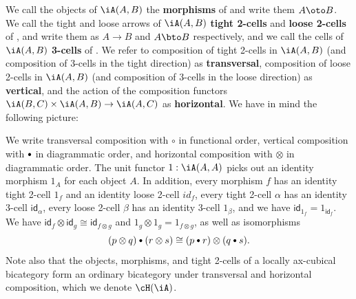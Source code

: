 \documentclass{amsart}
\newcommand{\bcomp}{\mathbin{\raisebox{1pt}{\scriptsize$\bullet$}}}
\let\ocomp\otimes
\renewcommand{\id}{\mathsf{id}}
\begin{document}
We call the objects of $\iA(A,B)$ the \textbf{morphisms} of \iA and write them $A\oto B$.
We call the tight and loose arrows of $\iA(A,B)$ \textbf{tight 2-cells} and \textbf{loose 2-cells} of \iA, and write them as $A\to B$ and $A\bto B$ respectively, and we call the cells of $\iA(A,B)$ \textbf{3-cells} of \iA.
We refer to composition of tight 2-cells in $\iA(A,B)$ (and composition of 3-cells in the tight direction) as \textbf{transversal}, composition of loose 2-cells in $\iA(A,B)$ (and composition of 3-cells in the loose direction) as \textbf{vertical}, and the action of the composition functors $\iA(B,C)\times \iA(A,B) \to \iA(A,C)$ as \textbf{horizontal}.
We have in mind the following picture:
\begin{center}
\end{center}

We write transversal composition with $\circ$ in functional order, vertical composition with $\bcomp $ in diagrammatic order, and horizontal composition with $\ocomp$ in diagrammatic order.
The unit functor $1:\iA(A,A)$ picks out an identity morphism $1_A$ for each object $A$.
In addition, every morphism $f$ has an identity tight 2-cell $1_f$ and an identity loose 2-cell $id_f$, every tight 2-cell $\alpha$ has an identity 3-cell $\id_\alpha$, every loose 2-cell $\beta$ has an identity 3-cell $1_\beta$, and we have $\id_{1_f} = 1_{\id_f}$.
We have $\id_f \ocomp \id_{g} \cong \id_{f\ocomp g}$ and $1_g \ocomp 1_g = 1_{f\ocomp g}$, as well as isomorphisms
\begin{equation}
  (p\ocomp q) \bcomp (r\ocomp s) \cong (p\bcomp r) \ocomp (q\bcomp s).\label{eq:interchange}
\end{equation}
Note also that the objects, morphisms, and tight 2-cells of a locally ax-cubical bicategory \iA form an ordinary bicategory under transversal and horizontal composition, which we denote $\cH(\iA)$.
\end{document}
